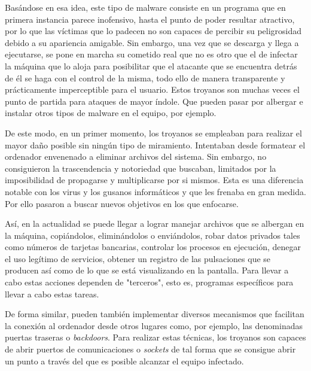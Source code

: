 \documentclass[12pt]{article}
\newcommand{\newpar} {
    \vskip 0.5cm
}
\begin{document}
            \newpar

            Basándose en esa idea, este tipo de malware consiste en un programa que en primera instancia parece inofensivo, hasta el punto de poder resultar atractivo, por lo que las víctimas que lo padecen no son capaces de percibir su peligrosidad debido a su apariencia amigable. Sin embargo, una vez que se descarga y llega a ejecutarse, se pone en marcha su cometido real que no es otro que el de infectar la máquina que lo aloja para posibilitar que el atacante que se encuentra detrás de él se haga con el control de la misma, todo ello de manera transparente y prácticamente imperceptible para el usuario. Estos troyanos son muchas veces el punto de partida para ataques de mayor índole. Que pueden pasar por albergar e instalar otros tipos de malware en el equipo, por ejemplo.

            \newpar

            De este modo, en un primer momento, los troyanos se empleaban para realizar el mayor daño posible sin ningún tipo de miramiento. Intentaban desde formatear el ordenador envenenado a eliminar archivos del sistema. Sin embargo, no consiguieron la trascendencia y notoriedad que buscaban, limitados por la imposibilidad de propagarse y multiplicarse por si mismos. Esta es una diferencia notable con los virus y los gusanos informáticos y que les frenaba en gran medida. Por ello pasaron a buscar nuevos objetivos en los que enfocarse.

            \newpar

            Así, en la actualidad se puede llegar a lograr manejar archivos que se albergan en la máquina, copiándolos, eliminándolos o enviándolos, robar datos privados tales como números de tarjetas bancarias, controlar los procesos en ejecución, denegar el uso legítimo de servicios, obtener un registro de las pulsaciones que se producen así como de lo que se está visualizando en la pantalla. Para llevar a cabo estas acciones dependen de "terceros", esto es, programas específicos para llevar a cabo estas tareas.

            \newpar

            De forma similar, pueden también implementar diversos mecanismos que facilitan la conexión al ordenador desde otros lugares como, por ejemplo, las denominadas puertas traseras o \textit{backdoors}. Para realizar estas técnicas, los troyanos son capaces de abrir puertos de comunicaciones o \textit{sockets} de tal forma que se consigue abrir un punto a través del que es posible alcanzar el equipo infectado.
\end{document}
